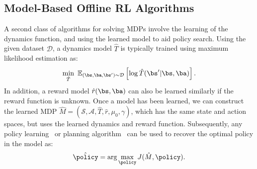 \subsection{Model-Based Offline RL Algorithms}
A second class of algorithms for solving MDPs involve the learning of the dynamics function, and using the learned model to aid policy search. Using the given dataset $\mathcal{D}$, a dynamics model $\hat{T}$ is typically trained using maximum likelihood estimation as:
\[
\min_{\hat{T}} \ \mathbb{E}_{(\bs, \ba, \bs') \sim \mathcal{D}} \left[ \log \hat{T}(\bs' | \bs, \ba) \right].
\]
In addition, a reward model $\hat{r}(\bs, \ba)$ can also be learned similarly if the reward function is unknown. Once a model has been learned, we can construct the learned MDP $\hat{M} = (\mathcal{S}, \mathcal{A}, \hat{T}, \hat{r}, \mu_0, \gamma)$, which has the same state and action spaces, but uses the learned dynamics and reward function. Subsequently, any policy learning~\cite{schulman2017proximal, haarnoja2018soft, Abdolmaleki2018MaximumAP, Rajeswaran-Game-MBRL} or planning algorithm~\cite{Todorov2005, WilliamsMPPI, POLO, Nagabandi2019DeepDM} can be used to recover the optimal policy in the model as:
\[
\hat{\policy} = \arg \max_{\policy} J(\hat{M}, \policy).
\]


